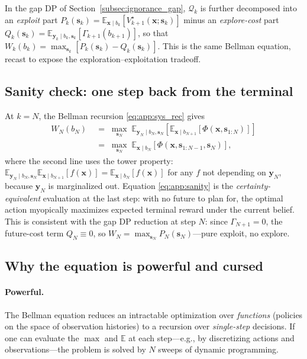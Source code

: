 \documentclass[11pt,a4paper]{article}
\newcommand{\E}{\mathbb{E}}
\begin{document}
In the gap DP of Section~\ref{subsec:ignorance_gap}, $\mathcal{Q}_k$ is further decomposed into an \emph{exploit} part $P_k(\bm{s}_k) = \E_{\bm{x} \mid b_k}[V_{k+1}^\star(\bm{x}; \bm{s}_k)]$ minus an \emph{explore-cost} part $Q_k(\bm{s}_k) = \E_{\bm{y}_k \mid b_k, \bm{s}_k}[\Gamma_{k+1}(b_{k+1})]$, so that $W_k(b_k) = \max_{\bm{s}_k}[P_k(\bm{s}_k) - Q_k(\bm{s}_k)]$.  This is the same Bellman equation, recast to expose the exploration--exploitation tradeoff.

\subsection{Sanity check: one step back from the terminal}

At $k = N$, the Bellman recursion \eqref{eq:app:sys_rec} gives
\begin{align}
  W_N(b_N) &\;=\; \max_{\bm{s}_N}\; \E_{\bm{y}_N \mid b_N, \bm{s}_N}\!\left[\E_{\bm{x} \mid b_{N+1}}[\Phi(\bm{x}, \bm{s}_{1:N})]\right] \\
  &\;=\; \max_{\bm{s}_N}\; \E_{\bm{x} \mid b_N}\!\left[\Phi(\bm{x}, \bm{s}_{1:N-1}, \bm{s}_N)\right],
  \label{eq:app:sanity}
\end{align}
where the second line uses the tower property: $\E_{\bm{y}_N \mid b_N, \bm{s}_N} \E_{\bm{x} \mid b_{N+1}}[f(\bm{x})] = \E_{\bm{x} \mid b_N}[f(\bm{x})]$ for any $f$ not depending on $\bm{y}_N$, because $\bm{y}_N$ is marginalized out.  Equation \eqref{eq:app:sanity} is the \emph{certainty-equivalent} evaluation at the last step: with no future to plan for, the optimal action myopically maximizes expected terminal reward under the current belief.  This is consistent with the gap DP reduction at step $N$: since $\Gamma_{N+1} = 0$, the future-cost term $Q_N \equiv 0$, so $W_N = \max_{\bm{s}_N} P_N(\bm{s}_N)$---pure exploit, no explore.

\subsection{Why the equation is powerful and cursed}

\paragraph{Powerful.}  The Bellman equation reduces an intractable optimization over \emph{functions} (policies on the space of observation histories) to a recursion over \emph{single-step} decisions.  If one can evaluate the $\max$ and $\E$ at each step---e.g., by discretizing actions and observations---the problem is solved by $N$ sweeps of dynamic programming.
\end{document}

